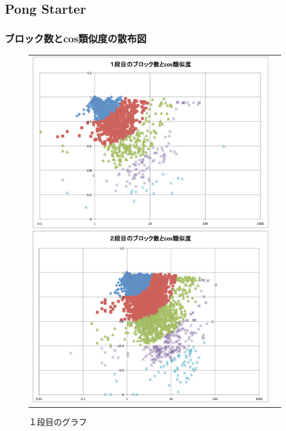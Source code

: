 \documentclass[twocolumn,9pt,a4paper]{jsarticle}
\begin{document}
\subsection{Pong Starter}
\subsubsection{ブロック数とcos類似度の散布図}
\begin{figure}[h]
 \begin{tabular}{cc}
 	\begin{minipage}[t]{0.45\hsize}
	 \centering
	 \includegraphics[keepaspectratio, scale = 0.15]{graph_1_block.pdf}
	 \caption{１段目のグラフ}
	 \label{first_block}
	\end{minipage}
        \begin{minipage}[t]{0.45\hsize}
	 \centering
	 \includegraphics[keepaspectratio, scale = 0.15]{graph_2_block.pdf}

\end{minipage}
\end{tabular}
\end{figure}
\end{document}
